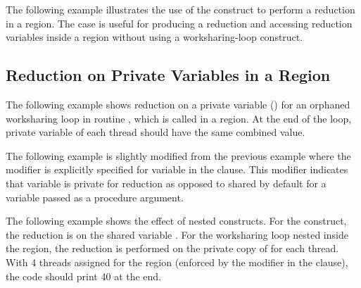 The following example illustrates the use of the  construct 
to perform a reduction in a  region. The case is useful for 
producing a reduction and accessing reduction variables inside a  region 
without using a worksharing-loop construct.

\clearpage


\subsection{Reduction on Private Variables in a  Region}
\label{subsec:priv_reduction}

The following example shows reduction on a private variable ()
for an orphaned worksharing loop in routine ,
which is called in a  region.
At the end of the loop, private variable of each thread should have the same combined value.

The following example is slightly modified from the previous example 
where the  modifier is explicitly specified
for variable  in the  clause.
This modifier indicates that variable  is private
for reduction as opposed to shared by default for a variable
passed as a procedure argument.
\clearpage

The following example shows the effect of nested  constructs.
For the  construct, the reduction is on the shared variable
.  For the worksharing loop nested inside the 
region, the reduction is performed on the private copy of 
for each thread.
With 4 threads assigned for the  region
(enforced by the  modifier in the  clause),
the code should print 40 at the end.
